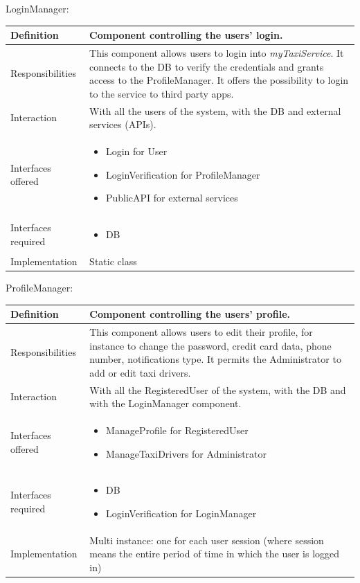 \documentclass[a4paper,11pt]{report} %
\newcommand{\mts}{\mbox{\normalfont\itshape myTaxiService}}
\begin{document}
	\pagebreak
	\centerline{LoginManager:}	
	\begin{center}
		\begin{tabular}{| l | p{9cm} |}\hline
			Definition & Component controlling the users' login.\\\hline
			Responsibilities & This component allows users to login into \mts{}. It connects to the DB to verify the credentials and grants access to the ProfileManager. It offers the possibility to login to the service to third party apps.\\\hline
			Interaction & With all the users of the system, with the DB and external services (APIs).\\\hline
			Interfaces offered & \begin{itemize}
				\item Login for User
				\item LoginVerification for ProfileManager
				\item PublicAPI for external services
			\end{itemize}\\\hline
			Interfaces required & \begin{itemize}
				\item DB 
			\end{itemize}\\\hline
			Implementation & Static class\\\hline
		\end{tabular}
	\end{center}
	\bigskip
	\bigskip
	\centerline{ProfileManager:}
	\begin{center}
		\begin{tabular}{| l | p{9cm} |}\hline
			Definition & Component controlling the users' profile.\\\hline
			Responsibilities & This component allows users to edit their profile, for instance to change the password, credit card data, phone number, notifications type. It permits the Administrator to add or edit taxi drivers.\\\hline
			Interaction & With all the RegisteredUser of the system, with the DB and with the LoginManager component.\\\hline
			Interfaces offered & \begin{itemize}
				\item ManageProfile for RegisteredUser
				\item ManageTaxiDrivers for Administrator
			\end{itemize}\\\hline
			Interfaces required & \begin{itemize}
				\item DB
				\item LoginVerification for LoginManager
			\end{itemize}\\\hline
			Implementation & Multi instance: one for each user session (where session means the entire period of time in which the user is logged in)\\\hline
		\end{tabular}
	\end{center}
	
\end{document}

